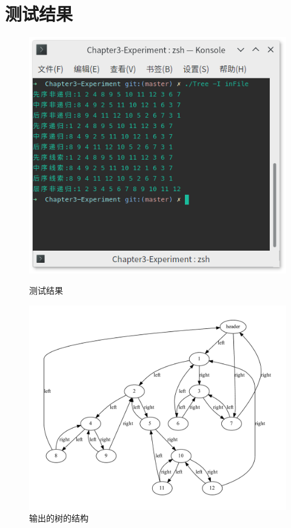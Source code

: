 \section{测试结果}
\begin{figure}[H]
    \begin{minipage}[c]{0.5\linewidth}
        \centering
        \includegraphics[width=\linewidth]{figures/Run}
        \caption{测试结果}
        \label{fig:test}
    \end{minipage}
    \begin{minipage}[c]{0.5\linewidth}
        \centering
        \includegraphics[width=\linewidth]{figures/TreeStructure}
        \caption{输出的树的结构}
        \label{fig:test}
    \end{minipage}
\end{figure}